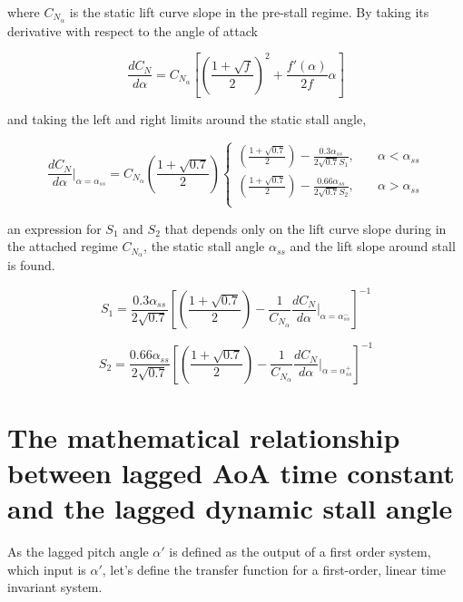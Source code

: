 \noindent where $C_{N_\alpha}$ is the static lift curve slope in the pre-stall regime. By taking its derivative with respect to the angle of attack

\begin{equation}
\frac{dC_N}{d\alpha} = C_{N_{\alpha}} \left[\left(\frac{1+\sqrt{f}}{2}\right)^2+\frac{f'(\alpha)}{2f}\alpha \right]
\end{equation}

\noindent and taking the left and right limits around the static stall angle,

\begin{equation}
\frac{dC_N}{d\alpha}|_{\alpha=\alpha_{ss}} = C_{N_\alpha}\left(\frac{1+\sqrt{0.7}}{2}\right)
     \begin{cases}
      \left(\frac{1+\sqrt{0.7}}{2}\right)-\frac{0.3\alpha_{ss}}{2\sqrt{0.7}S_1},&\quad \alpha < \alpha_{ss}\\
        \left(\frac{1+\sqrt{0.7}}{2}\right)-\frac{0.66\alpha_{ss}}{2\sqrt{0.7}S_2}, &\quad \alpha > \alpha_{ss}\\
     \end{cases}
\end{equation}

\noindent an expression for $S_1$ and $S_2$ that depends only on the lift curve slope during in the attached regime $C_{N_\alpha}$, the static stall angle $\alpha_{ss}$ and the lift slope around stall is found.

\begin{equation}
S_1 = \frac{0.3\alpha_{ss}}{2\sqrt{0.7}}\left[\left(\frac{1+\sqrt{0.7}}{2}\right)-\frac{1}{C_{N_\alpha}}\frac{dC_N}{d\alpha}|_{\alpha=\alpha_{ss}^{-}}\right]^{-1}
\end{equation}

\begin{equation}
S_2 = \frac{0.66\alpha_{ss}}{2\sqrt{0.7}}\left[\left(\frac{1+\sqrt{0.7}}{2}\right)-\frac{1}{C_{N_\alpha}}\frac{dC_N}{d\alpha}|_{\alpha=\alpha_{ss}^{+}}\right]^{-1}
\end{equation}

\section{The mathematical relationship between lagged AoA time constant and the lagged dynamic stall angle}

As the lagged pitch angle $\alpha'$ is defined as the output of a first order system, which input is $\alpha'$, let's define the transfer function for a first-order, linear time invariant system. 

